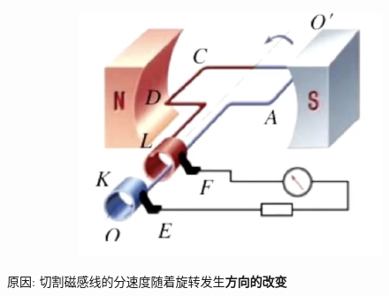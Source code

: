 \documentclass{article}
\begin{document}
\begin{enumerate}
\begin{enumerate}[label=(\arabic*)]
\begin{figure}[h]
\begin{subfigure}{0.4\textwidth}
                            \includegraphics[width=\textwidth,keepaspectratio]{pictures/1.1-4.png}
                            \caption{}
                        \end{subfigure}
                    \end{figure}
                    原因: \quad 切割磁感线的分速度随着旋转发生\textbf{方向的改变}
          \end{enumerate}

\end{enumerate}
\end{document}
